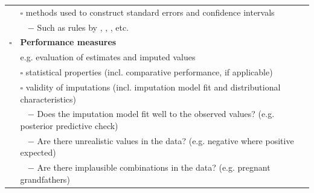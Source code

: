 \documentclass[bimj,fleqn]{w-art}
\begin{document}
\begin{table}[ht!]
\begin{tabular}{ll}
  & $\square$ methods used to construct standard errors and confidence intervals \\ 
  & $\;\;$ $-$ Such as rules by \citet{rubi87}, \citet{bar99}, \citet{rei03}, etc.    \\ \hline
$\square$ & \textbf{Performance measures}                                                           \\      
  & e.g. evaluation of estimates and imputed values                                                \\ \cline{2-2} 
  & $\square$ statistical properties (incl. comparative performance, if   applicable)                      \\
  & $\square$ validity of imputations (incl. imputation model fit and distributional characteristics)    \\ 
  & $\;\;$ $-$ Does the imputation model fit well to the observed values? (e.g. posterior predictive check)   \\ 
  & $\;\;$ $-$ Are there unrealistic values in the data? (e.g. negative where positive expected)   \\ 
  & $\;\;$ $-$ Are there implausible combinations in the data? (e.g. pregnant grandfathers)   \\ \hline
  
\end{tabular}
\end{table}






\end{document}
